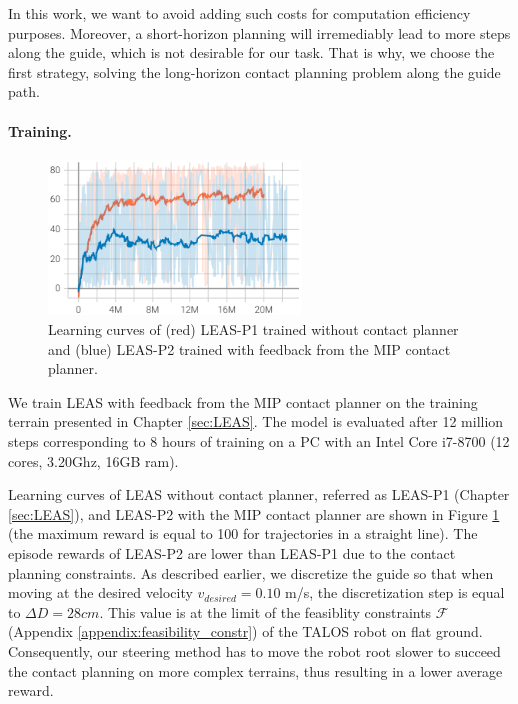 In this work, we want to avoid adding such costs for computation efficiency purposes. 
Moreover, a short-horizon planning will irremediably lead to more steps along the guide, which is not desirable for our task.
That is why, we choose the first strategy, solving the long-horizon contact planning problem along the guide path.


\paragraph{Training.}
\begin{figure}[t]
    \centering
    \includegraphics[trim={0 0 0 0},clip,width=0.6\textwidth]{Figures/Chapter_MIP_SL1M/learning_curve_MIP_P1.png}
    \caption{Learning curves of (red) LEAS-P1 trained without contact planner and (blue) LEAS-P2 trained with feedback from the MIP contact planner.}
    \label{fig:mip:learning_curves}
\end{figure}
We train LEAS with feedback from the MIP contact planner on the training terrain presented in Chapter \ref{sec:LEAS}.
The model is evaluated after 12 million steps corresponding to 8 hours of training on a PC with an Intel Core i7-8700 (12 cores, 3.20Ghz, 16GB ram). 

Learning curves of LEAS without contact planner, referred as LEAS-P1 (Chapter \ref{sec:LEAS}), and LEAS-P2 with the MIP contact planner are shown in Figure \ref{fig:mip:learning_curves} (the maximum reward is equal to 100 for trajectories in a straight line).
The episode rewards of LEAS-P2 are lower than LEAS-P1 due to the contact planning constraints. 
As described earlier, we discretize the guide so that when moving at the desired velocity $v_{desired}=0.10$ m/s, the discretization step is equal to $\Delta D=28cm$. 
This value is at the limit of the feasiblity constraints $\mathcal{F}$ (Appendix \ref{appendix:feasibility_constr}) of the TALOS robot on flat ground. 
Consequently, our steering method has to move the robot root slower to succeed the contact planning on more complex terrains, thus resulting in a lower average reward.



